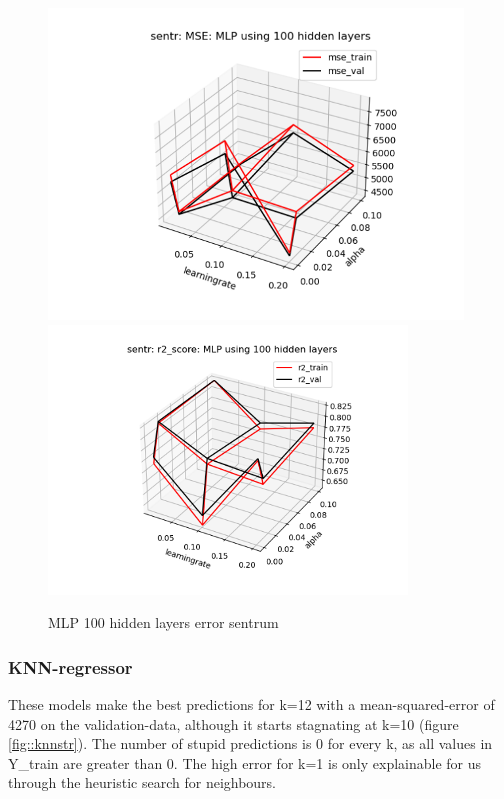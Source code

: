 \documentclass[12pt,a4paper]{scrartcl}		%
\begin{document}
\begin{figure}[h]
    \centering
    \includegraphics[scale = 1.1]{sntr_mlp_mse_100.png}
    \includegraphics[scale = 1.1]{sntr_mlp_r2_100.png}
    \caption{MLP 100 hidden layers error sentrum}
    \label{fig::mlpstr100}
\end{figure}

\subsubsection{KNN-regressor}
These models make the best predictions for k=12 with a mean-squared-error of 4270 on the validation-data, although it starts stagnating at k=10 (figure \ref{fig::knnstr}). 
The number of stupid predictions is 0 for every k, as all values in Y\_train are greater than 0. The high error for k=1 is only explainable for us through the heuristic 
search for neighbours.\\
\end{document}
